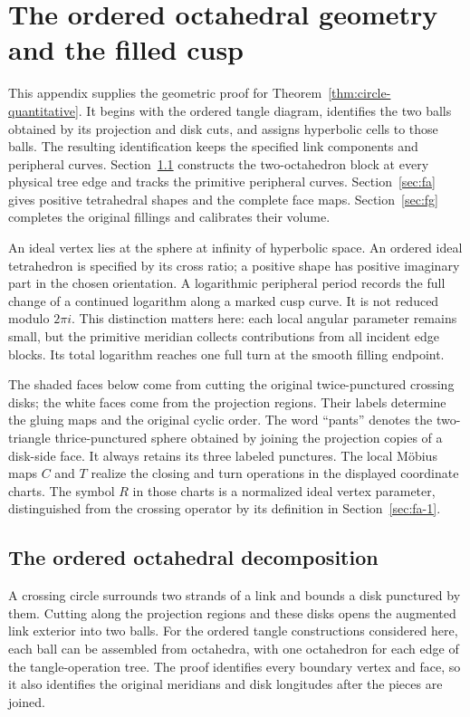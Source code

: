 \chapter{The ordered octahedral geometry and the filled cusp}\label{app:quantitative-geometry}

This appendix supplies the geometric proof for
Theorem~\ref{thm:circle-quantitative}. It begins with the ordered tangle diagram, identifies the two balls
obtained by its projection and disk cuts, and assigns hyperbolic cells
to those balls. The resulting identification keeps the specified link
components and peripheral curves. Section~\ref{sec:ft}
constructs the two-octahedron block at every physical tree edge and
tracks the primitive peripheral curves. Section~\ref{sec:fa} gives
positive tetrahedral shapes and the complete face maps.
Section~\ref{sec:fg} completes the original fillings and calibrates
their volume.

An ideal vertex lies at the sphere at infinity of hyperbolic space.
An ordered ideal tetrahedron is specified by its cross ratio; a
positive shape has positive imaginary part in the chosen orientation.
A logarithmic peripheral period records the full change of a continued
logarithm along a marked cusp curve. It is not reduced modulo $2\pi i$.
This distinction matters here: each local angular parameter remains
small, but the primitive meridian collects contributions from all
incident edge blocks. Its total logarithm reaches one full turn at
the smooth filling endpoint.

The shaded faces below come from cutting the original twice-punctured
crossing disks; the white faces come from the projection regions.
Their labels determine the gluing maps and the original cyclic order.
The word ``pants'' denotes the two-triangle thrice-punctured sphere
obtained by joining the projection copies of a disk-side face. It
always retains its three labeled punctures. The local M\"obius maps
$C$ and $T$ realize the closing and turn operations in the displayed
coordinate charts. The symbol $R$ in those charts is a normalized
ideal vertex parameter, distinguished from the crossing operator
by its definition in Section~\ref{sec:fa-1}.

\section{The ordered octahedral decomposition}\label{sec:ft}

A crossing circle surrounds two strands of a link and bounds a disk punctured by them. Cutting along the projection regions and these disks opens the augmented link exterior into two balls. For the ordered tangle constructions considered here, each ball can be assembled from octahedra, with one octahedron for each edge of the tangle-operation tree. The proof identifies every boundary vertex and face, so it also identifies the original meridians and disk longitudes after the pieces are joined.

